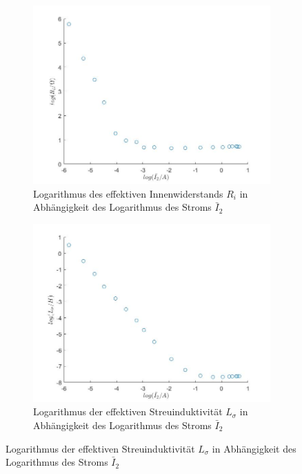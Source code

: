 \documentclass[a4paper, 12pt,]{scrartcl}
\begin{document}
\begin{figure}[H]\centering
\begin{adjustwidth}{-1em}{7em}
  \begin{subfigure}[b]{0.5\textwidth}
    \includegraphics[width=\textwidth]{I2Rilog}
    \caption{Logarithmus des effektiven Innenwiderstands $R_i$ in Abhängigkeit des Logarithmus des Stroms $\bar{I}_2$}
    \label{fig:}
  \end{subfigure}
  \begin{subfigure}[b]{0.5\textwidth}
    \includegraphics[width=\textwidth]{I2Lslog}
    \caption{Logarithmus der effektiven Streuinduktivität $L_\sigma$ in Abhängigkeit des Logarithmus des Stroms $\bar{I}_2$}
    \label{fig:}
  \end{subfigure}
\end{adjustwidth}\centering
\end{figure}
\end{document}
